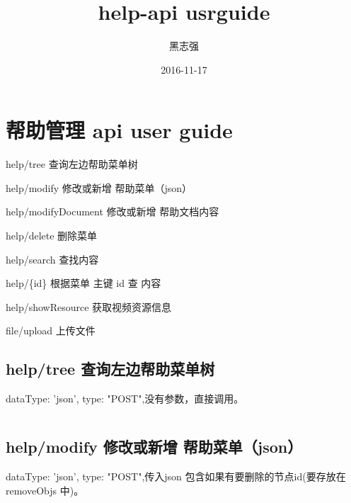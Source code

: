 \documentclass[UTF8]{ctexart}
\title{help-api usrguide }
\author{黑志强}
\date{2016-11-17}
\begin{document}
 \maketitle
 \tableofcontents


\section{帮助管理 api user guide}

help/tree  查询左边帮助菜单树

help/modify   修改或新增 帮助菜单（json）

help/modifyDocument   修改或新增 帮助文档内容

help/delete   删除菜单

help/search   查找内容

help/\{id\}     根据菜单 主键 id 查 内容

help/showResource 获取视频资源信息

file/upload   上传文件




\subsection{help/tree  查询左边帮助菜单树}
dataType: 'json', type: "POST",没有参数，直接调用。

\medskip
\begin{lstlisting}

\end{lstlisting}


\subsection{help/modify   修改或新增 帮助菜单（json）}

dataType: 'json', type: "POST",传入json 包含如果有要删除的节点id(要存放在 removeObjs 中)。
\end{document}
